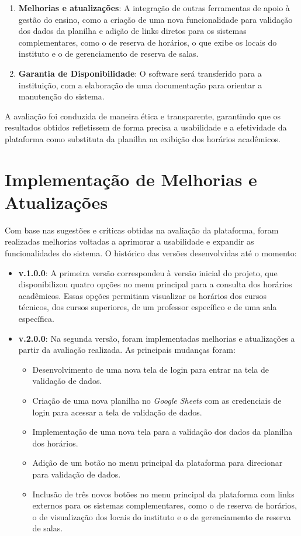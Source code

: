 \begin{itemize}
\begin{itemize}
\begin{enumerate}
            \item \textbf{Melhorias e atualizações}: A integração de outras ferramentas de apoio à gestão do ensino, como a criação de uma nova funcionalidade para validação dos dados da planilha e adição de links diretos para os sistemas complementares, como o de reserva de horários, o que exibe os locais do instituto e o de gerenciamento de reserva de salas.
            \item \textbf{Garantia de Disponibilidade}: O software será transferido para a instituição, com a elaboração de uma documentação para orientar a manutenção do sistema.
        \end{enumerate}
    \end{itemize}
\end{itemize}

A avaliação foi conduzida de maneira ética e transparente, garantindo que os resultados obtidos refletissem de forma precisa a usabilidade e a efetividade da plataforma como substituta da planilha na exibição dos horários acadêmicos.

\section{Implementação de Melhorias e Atualizações}

Com base nas sugestões e críticas obtidas na avaliação da plataforma, foram realizadas melhorias voltadas a aprimorar a usabilidade e expandir as funcionalidades do sistema. O histórico das versões desenvolvidas até o momento:

\begin{itemize}
    \item \textbf{v.1.0.0}: A primeira versão correspondeu à versão inicial do projeto, que disponibilizou quatro opções no menu principal para a consulta dos horários acadêmicos. Essas opções permitiam visualizar os horários dos cursos técnicos, dos cursos superiores, de um professor específico e de uma sala específica.
    \item \textbf{v.2.0.0}: Na segunda versão, foram implementadas melhorias e atualizações a partir da avaliação realizada. As principais mudanças foram:
    \begin{itemize}
        \item Desenvolvimento de uma nova tela de login para entrar na tela de validação de dados.
        \item Criação de uma nova planilha no \textit{Google Sheets} com as credenciais de login para acessar a tela de validação de dados.
        \item Implementação de uma nova tela para a validação dos dados da planilha dos horários.
        \item Adição de um botão no menu principal da plataforma para direcionar para validação de dados.
        \item Inclusão de três novos botões no menu principal da plataforma com links externos para os sistemas complementares, como o de reserva de horários, o de visualização dos locais do instituto e o de gerenciamento de reserva de salas.
    \end{itemize}
\end{itemize}


